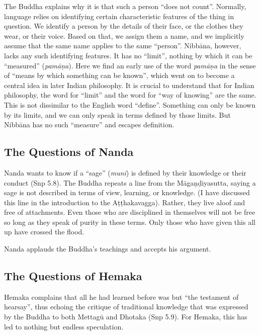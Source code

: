 \documentclass[12pt,openany]{book}%
\begin{document}
The Buddha explains why it is that such a person “does not count”. Normally, language relies on identifying certain characteristic features of the thing in question. We identify a person by the details of their face, or the clothes they wear, or their voice. Based on that, we assign them a name, and we implicitly assume that the same name applies to the same “person”. \textsanskrit{Nibbāna}, however, lacks any such identifying features. It has no “limit”, nothing by which it can be “measured” (\textit{\textsanskrit{pamāṇa}}). Here we find an early use of the word \textit{\textsanskrit{pamāṇa}} in the sense of “means by which something can be known”, which went on to become a central idea in later Indian philosophy. It is crucial to understand that for Indian philosophy, the word for “limit” and the word for “way of knowing” are the same. This is not dissimilar to the English word “define”. Something can only be known by its limits, and we can only speak in terms defined by those limits. But \textsanskrit{Nibbāna} has no such “measure” and escapes definition.

\subsection*{The Questions of Nanda}

Nanda wants to know if a “sage” (\textit{muni}) is defined by their knowledge or their conduct (Snp 5.8). The Buddha repeats a line from the \textsanskrit{Māgaṇḍiyasutta}, saying a sage is not described in terms of view, learning, or knowledge. (I have discussed this line in the introduction to the \textsanskrit{Aṭṭhakavagga}). Rather, they live aloof and free of attachments. Even those who are disciplined in themselves will not be free so long as they speak of purity in these terms. Only those who have given this all up have crossed the flood.

Nanda applauds the Buddha’s teachings and accepts his argument.

\subsection*{The Questions of Hemaka}

Hemaka complains that all he had learned before was but “the testament of hearsay”, thus echoing the critique of traditional knowledge that was expressed by the Buddha to both \textsanskrit{Mettagū} and Dhotaka (Snp 5.9). For Hemaka, this has led to nothing but endless speculation.
\end{document}
